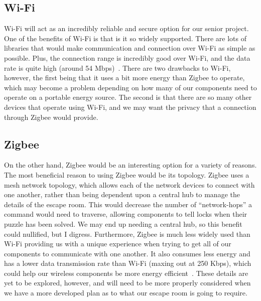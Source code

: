 \documentclass[conference]{IEEEtran}
\begin{document}
\subsection*{Wi-Fi}
Wi-Fi will act as an incredibly reliable and secure option for our senior project. One of the benefits of Wi-Fi
is that is it so widely supported. There are lots of libraries that would make communication and connection over
Wi-Fi as simple as possible. Plus, the connection range is incredibly good over Wi-Fi, and the data rate is quite high
(around 54 Mbps)~\cite{wifiVsZigbee}. There are two drawbacks to Wi-Fi, however, the first being that it uses a bit more energy than Zigbee
to operate, which may become a problem depending on how many of our components need to operate on a portable energy
source. The second is that there are so many other devices that operate using Wi-Fi, and we may want the privacy that
a connection through Zigbee would provide.

\subsection*{Zigbee}
On the other hand, Zigbee would be an interesting option for a variety of reasons. The most beneficial reason to using
Zigbee would be its topology. Zigbee uses a mesh network topology, which allows each of the network devices to connect with
one another, rather than being dependent upon a central hub to manage the details of the escape room. This would decrease
the number of ``network-hops'' a command would need to traverse, allowing components to tell locks when their puzzle has been
solved. We may end up needing a central hub, so this benefit could nullified, but I digress. Furthermore, Zigbee is much less
widely used than Wi-Fi providing us with a unique experience when trying to get all of our components to communicate
with one another. It also consumes less energy and has a lower data transmission rate than Wi-Fi (maxing out at 250 Kbps),
which could help our wireless components be more energy efficient~\cite{wifiVsZigbee}. These details are yet to be explored,
however, and will need to be more properly considered when we have a more developed plan as to what our escape room is going to require.


\end{document}
